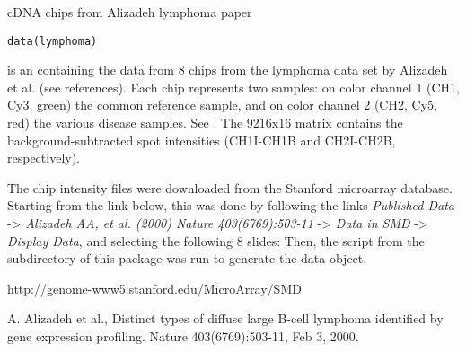 \begin{Description} cDNA chips from Alizadeh lymphoma paper
\end{Description}
\begin{Usage}
\begin{verbatim}data(lymphoma)\end{verbatim}
\end{Usage}
\begin{Format}\relax
{} is an 
containing the data from 8 chips
from the lymphoma data set by Alizadeh et al. (see references). Each
chip represents two samples: on color channel 1 (CH1, Cy3, green) the
common reference sample, and on color channel 2 (CH2, Cy5, red) the
various disease samples. See . The 9216x16
matrix  contains the background-subtracted spot
intensities (CH1I-CH1B and CH2I-CH2B, respectively).
\end{Format}
\begin{Details}\relax
The chip intensity files were downloaded from the Stanford
microarray database. Starting from the link below, this was done by
following the links \emph{Published Data} -> 
\emph{Alizadeh AA, et al. (2000) Nature 403(6769):503-11} -> 
\emph{Data in SMD} -> \emph{Display Data}, and selecting the following 
8 slides:
Then, the script  from the  subdirectory
of this package was run to generate the \R{} data object.
\end{Details}
\begin{Source}\relax
http://genome-www5.stanford.edu/MicroArray/SMD
\end{Source}
\begin{References}\relax
A. Alizadeh et al., Distinct types of diffuse large B-cell 
lymphoma identified by gene expression profiling. Nature 403(6769):503-11, 
Feb 3, 2000.
\end{References}

